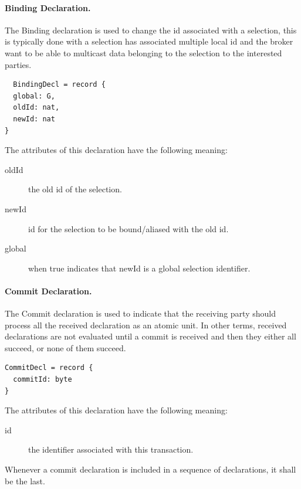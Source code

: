 \documentclass[a4paper,oneside,article]{memoir}
\begin{document}
\paragraph{Binding Declaration.} The Binding declaration is used to change the id associated with a
selection, this is typically done with a selection has associated multiple local id and the broker
want to be able to multicast data belonging to the selection to the interested parties.
\begin{verbatim}
  BindingDecl = record {
  global: G,
  oldId: nat,
  newId: nat
}
\end{verbatim}

The attributes of this declaration have the following meaning:
\begin{description}
\item[oldId] the old id of the selection.
\item[newId] id for the selection to be bound/aliased with the old id.
\item[global] when true indicates that newId is a global selection identifier.
\end{description}

\paragraph{Commit Declaration.} The Commit declaration is used to indicate that the receiving party
should process all the received declaration as an atomic unit.  In other terms, received
declarations are not evaluated until a commit is received and then they either all succeed, or none
of them succeed.
\begin{verbatim}
CommitDecl = record {
  commitId: byte
}  
\end{verbatim}

The attributes of this declaration have the following meaning:
\begin{description}
\item[id] the identifier associated with this transaction.
\end{description}
Whenever a commit declaration is included in a sequence of declarations, it shall be the last.
\end{document}
